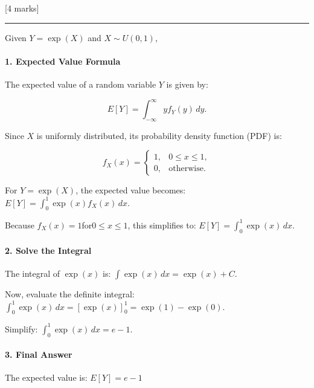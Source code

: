 \documentclass[11pt]{article}
\begin{document}
{[}4 marks{]}

    \begin{center}\rule{0.5\linewidth}{0.5pt}\end{center}

Given \(Y = \exp(X)\) and \(X \sim U(0, 1)\),

\paragraph{\texorpdfstring{\textbf{1. Expected Value
Formula}}{1. Expected Value Formula}}\label{expected-value-formula}

The expected value of a random variable \(Y\) is given by:

\[E[Y] = \int_{-\infty}^\infty y f_Y(y) \, dy.\]

Since \(X\) is uniformly distributed, its probability density function
(PDF) is:

\[
f_X(x) = 
\begin{cases} 
1, & 0 \leq x \leq 1, \\
0, & \text{otherwise}.
\end{cases}
\]

For \(Y = \exp(X)\), the expected value becomes:
\(E[Y] = \int_0^1 \exp(x) f_X(x) \, dx.\)

Because \(f_X(x) = 1\)for\(0 \leq x \leq 1\), this simplifies to:
\(E[Y] = \int_0^1 \exp(x) \, dx.\)

\paragraph{\texorpdfstring{\textbf{2. Solve the
Integral}}{2. Solve the Integral}}\label{solve-the-integral}

The integral of \(\exp(x)\) is: \(\int \exp(x) \, dx = \exp(x) + C.\)

Now, evaluate the definite integral:
\(\int_0^1 \exp(x) \, dx = \left[ \exp(x) \right]_0^1 = \exp(1) - \exp(0).\)

Simplify: \(\int_0^1 \exp(x) \, dx = e - 1.\)

\paragraph{\texorpdfstring{\textbf{3. Final
Answer}}{3. Final Answer}}\label{final-answer}

The expected value is: \(\boxed{E[Y] = e - 1}\)
\end{document}
